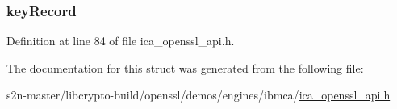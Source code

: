 \subsubsection[{\texorpdfstring{key\+Record}{keyRecord}}]{ key\+Record}\hypertarget{struct___i_c_a___k_e_y___r_s_a___m_o_d_e_x_p_o_abdb68bb25b18429d02982105537a8087}{}\label{struct___i_c_a___k_e_y___r_s_a___m_o_d_e_x_p_o_abdb68bb25b18429d02982105537a8087}


Definition at line 84 of file ica\+\_\+openssl\+\_\+api.\+h.



The documentation for this struct was generated from the following file\+:\begin{DoxyCompactItemize}
\item 
s2n-\/master/libcrypto-\/build/openssl/demos/engines/ibmca/\hyperlink{ica__openssl__api_8h}{ica\+\_\+openssl\+\_\+api.\+h}\end{DoxyCompactItemize}
